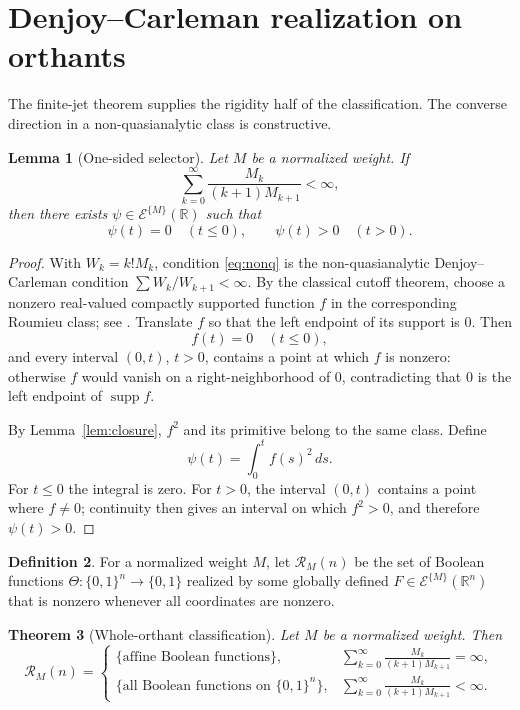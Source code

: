 \documentclass[11pt]{article}
\newtheorem{theorem}{Theorem}[section]
\newtheorem{lemma}[theorem]{Lemma}
\theoremstyle{definition}
\newtheorem{definition}[theorem]{Definition}
\theoremstyle{remark}
\newcommand{\R}{\mathbb{R}}
\newcommand{\bits}{\{0,1\}}
\begin{document}
\section{Denjoy--Carleman realization on orthants}\label{sec:dc}

The finite-jet theorem supplies the rigidity half of the classification. The converse direction in a non-quasianalytic class is constructive.

\begin{lemma}[One-sided selector]\label{thm:T4}
Let $M$ be a normalized weight. If
\begin{equation}\label{eq:nonq}
 \sum_{k=0}^{\infty}\frac{M_k}{(k+1)M_{k+1}}<\infty,
\end{equation}
then there exists $\psi\in\mathcal{E}^{\{M\}}(\R)$ such that
\[
 \psi(t)=0\quad(t\le0),
 \qquad
 \psi(t)>0\quad(t>0).
\]
\end{lemma}

\begin{proof}
With $W_k=k!M_k$, condition \eqref{eq:nonq} is the non-quasianalytic Denjoy--Carleman condition $\sum W_k/W_{k+1}<\infty$. By the classical cutoff theorem, choose a nonzero real-valued compactly supported function $f$ in the corresponding Roumieu class; see \cite[Theorem~3.6 and Corollary~3.12]{Rainer2022}. Translate $f$ so that the left endpoint of its support is $0$. Then
\[
 f(t)=0\quad(t\le0),
\]
and every interval $(0,t)$, $t>0$, contains a point at which $f$ is nonzero: otherwise $f$ would vanish on a right-neighborhood of $0$, contradicting that $0$ is the left endpoint of $\operatorname{supp}f$.

By Lemma~\ref{lem:closure}, $f^2$ and its primitive belong to the same class. Define
\[
 \psi(t)=\int_0^t f(s)^2\,ds.
\]
For $t\le0$ the integral is zero. For $t>0$, the interval $(0,t)$ contains a point where $f\ne0$; continuity then gives an interval on which $f^2>0$, and therefore $\psi(t)>0$.
\end{proof}

\begin{definition}
For a normalized weight $M$, let $\mathcal{R}_M(n)$ be the set of Boolean functions $\Theta:\bits^n\to\bits$ realized by some globally defined $F\in\mathcal{E}^{\{M\}}(\R^n)$ that is nonzero whenever all coordinates are nonzero.
\end{definition}

\begin{theorem}[Whole-orthant classification]\label{thm:T5}
Let $M$ be a normalized weight. Then
\[
 \mathcal{R}_M(n)=
 \begin{cases}
 \{\text{affine Boolean functions}\},
 &\displaystyle\sum_{k=0}^{\infty}\frac{M_k}{(k+1)M_{k+1}}=\infty,\\[1.1em]
 \{\text{all Boolean functions on }\bits^n\},
 &\displaystyle\sum_{k=0}^{\infty}\frac{M_k}{(k+1)M_{k+1}}<\infty.
 \end{cases}
\]
\end{theorem}
\end{document}

